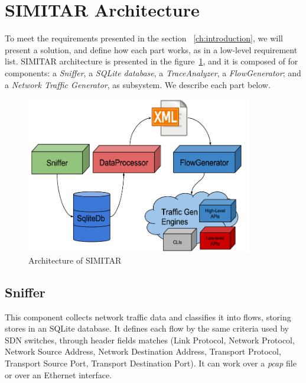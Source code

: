 \section{SIMITAR Architecture}


To meet the requirements presented in the section ~\ref{ch:introduction}, we will present a solution, and define how each part works, as in a low-level requirement list\cite{sommerville}. SIMITAR architecture is presented in the figure~\ref{fig:architecture}, and it is composed of for components: a \textit{Sniffer}, a \textit{SQLite database}, a \textit{TraceAnalyzer}, a \textit{FlowGenerator};  and a \textit{Network Traffic Generator}, as subsystem. We describe each part below.

\begin{figure}[ht!]
        \centering
        \includegraphics[height=2.7in]{figures/ch3/architecture-diagram}
        \caption{Architecture of SIMITAR}
    \label{fig:architecture}
\end{figure}



\subsection{Sniffer}

This component collects network traffic data and classifies it into flows, storing stores in an SQLite database. It defines each flow by the same criteria used by SDN switches\cite{sdn-survey}, through header fields matches (Link Protocol, Network Protocol, Network Source Address, Network Destination Address, Transport Protocol, Transport Source Port, Transport Destination Port). It can work over a \textit{pcap} file or over an Ethernet interface. 

